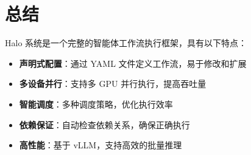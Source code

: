 \documentclass[12pt,a4paper]{article}
\begin{document}
\section{总结}

Halo 系统是一个完整的智能体工作流执行框架，具有以下特点：

\begin{itemize}
    \item \textbf{声明式配置}：通过 YAML 文件定义工作流，易于修改和扩展
    \item \textbf{多设备并行}：支持多 GPU 并行执行，提高吞吐量
    \item \textbf{智能调度}：多种调度策略，优化执行效率
    \item \textbf{依赖保证}：自动检查依赖关系，确保正确执行
    \item \textbf{高性能}：基于 vLLM，支持高效的批量推理
\end{itemize}
\end{document}
